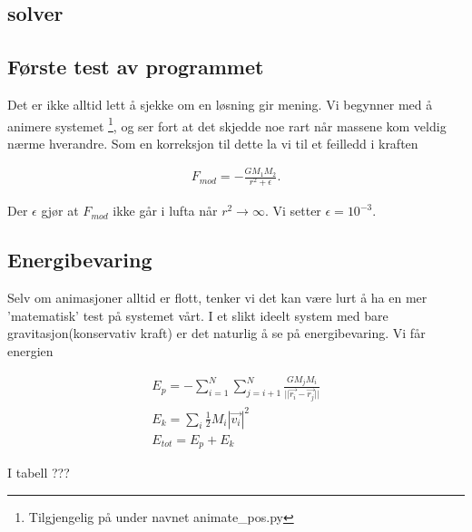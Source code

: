 \documentclass[11pt, twocolumn]{article}
\begin{document}
\subsection{solver}

\subsection{Første test av programmet}
Det er ikke alltid lett å sjekke om en løsning gir mening. Vi begynner med
å animere systemet \footnote{Tilgjengelig på \cite{github-repo} under navnet
animate\_pos.py}, og ser fort at det skjedde noe rart når massene kom veldig
nærme hverandre. Som en korreksjon til dette la vi til et feilledd i kraften

\begin{align}
F_{mod} = -\frac{GM_1M_2}{r^2 + \epsilon}.
\end{align}

Der $\epsilon$ gjør at $F_{mod}$ ikke går i lufta når $r^2 \rightarrow \infty$.
Vi setter $\epsilon = 10^{-3}$. 

\subsection{Energibevaring}
Selv om animasjoner alltid er flott, tenker vi det kan være lurt å ha en mer
'matematisk' test på systemet vårt. I et slikt ideelt system med bare 
gravitasjon(konservativ kraft) er det naturlig å se på energibevaring. Vi får
energien

\begin{align}
E_{p} = - \sum_{i = 1}^{N} \sum_{j = i+1}^{N} \frac{GM_jM_i}{{||\vec{r_i} - \vec{r_j}||}} \\
E_{k} = \sum_{i} \frac{1}{2}M_i|\vec{v_i}|^2 \\
E_{tot} = E_{p} + E_{k}
\end{align}

I tabell ???

\printbibliography
\end{document}
